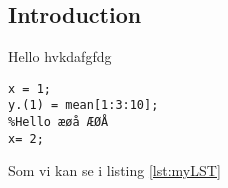 \documentclass[../main.tex]{subfiles}
\begin{document}
\subsection{Introduction}

Hello hvkdafgfdg

\begin{lstlisting}[caption={My lstlisting}, label={lst:myLST}]
x = 1;
y.(1) = mean[1:3:10];
%Hello æøå ÆØÅ
x= 2;
\end{lstlisting}

Som vi kan se i listing \ref{lst:myLST}
\end{document}
